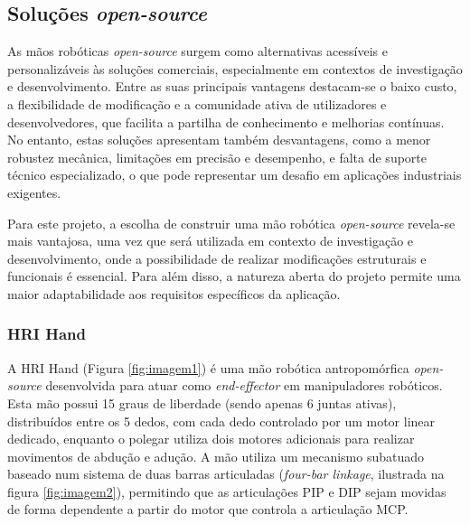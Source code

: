 \subsection{Soluções \textit{open-source}}

As mãos robóticas \textit{open-source} surgem como alternativas acessíveis e personalizáveis às soluções comerciais, especialmente em contextos de investigação e desenvolvimento. Entre as suas principais vantagens destacam-se o baixo custo, a flexibilidade de modificação e a comunidade ativa de utilizadores e desenvolvedores, que facilita a partilha de conhecimento e melhorias contínuas. No entanto, estas soluções apresentam também desvantagens, como a menor robustez mecânica, limitações em precisão e desempenho, e falta de suporte técnico especializado, o que pode representar um desafio em aplicações industriais exigentes.

Para este projeto, a escolha de construir uma mão robótica \textit{open-source} revela-se mais vantajosa, uma vez que será utilizada em contexto de investigação e desenvolvimento, onde a possibilidade de realizar modificações estruturais e funcionais é essencial. Para além disso, a natureza aberta do projeto permite uma maior adaptabilidade aos requisitos específicos da aplicação.


\subsubsection{HRI Hand}

A HRI Hand \cite{Park2020} (Figura \ref{fig:imagem1}) é uma mão robótica antropomórfica \textit{open-source} desenvolvida para atuar como \textit{end-effector} em manipuladores robóticos. Esta mão possui 15 graus de liberdade (sendo apenas 6 juntas ativas),
distribuídos entre os 5 dedos, com cada dedo controlado por um motor linear dedicado, enquanto o polegar utiliza dois motores adicionais para realizar movimentos de abdução e adução. A mão utiliza um mecanismo subatuado baseado num sistema de duas barras articuladas (\textit{four-bar linkage}, ilustrada na figura \ref{fig:imagem2}), permitindo que as articulações \ac{PIP} e \ac{DIP} sejam movidas de forma dependente a partir do motor que controla a articulação \ac{MCP}.


